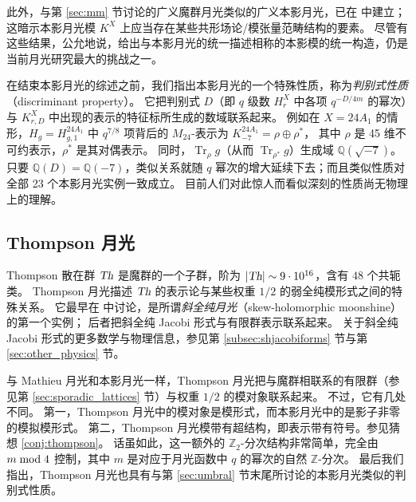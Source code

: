 \documentclass[11pt,a4paper,fontset=windows]{ctexart}
\numberwithin{equation}{section}
\newcommand{\Th}{\operatorname{\textsl{Th}}}      %
\newcommand{\QQ}{\mathbb{Q}}
\newcommand{\ZZ}{\mathbb{Z}}
\newcommand{\xmod}{{\rm \;mod\;}}
\newcommand{\tr}{\operatorname{Tr}}
\begin{document}
此外，与第 \ref{sec:mm} 节讨论的广义魔群月光类似的广义本影月光，已在 \cite{GUM} 中建立；
这暗示本影月光模 $K^X$ 上应当存在某些共形场论/模张量范畴结构的要素。
尽管有这些结果，公允地说，给出与本影月光的统一描述相称的本影模的统一构造，仍是当前月光研究最大的挑战之一。

在结束本影月光的综述之前，我们指出本影月光的一个特殊性质，称为\emph{判别式性质}（discriminant property）。
它把判别式 $D$（即 $q$ 级数 $H^X_r$ 中各项 $q^{-D/4m}$ 的幂次）与 $K_{r,D}^X$ 中出现的表示的特征标所生成的数域联系起来。
例如在 $X=24A_1$ 的情形，$H_g= H^{24A_1}_{g,1}$ 中 $q^{7/8}$ 项背后的 $M_{24}$-表示为 $K^{24A_1}_{-7} = \rho \oplus \rho^\ast$，
其中 $\rho$ 是 45 维不可约表示，$\rho^\ast$ 是其对偶表示。
同时，$\tr_\rho g$（从而 $\tr_{\rho^\ast} g$）生成域 $\QQ(\sqrt{-7})$。
只要 $\QQ(D)=\QQ(-7)$，类似关系就随 $q$ 幂次的增大延续下去；而且类似性质对全部 23 个本影月光实例一致成立。
目前人们对此惊人而看似深刻的性质尚无物理上的理解。


\subsection{Thompson 月光}

Thompson 散在群 $\Th$ 是魔群的一个子群，阶为 $|{\rm \it \Th}|\sim9\cdot10^{16}$，含有 $48$ 个共轭类。
Thompson 月光描述 $\Th$ 的表示论与某些权重 $1/2$ 的弱全纯模形式之间的特殊关系。
它最早在 \cite{Harvey:2015mca} 中讨论，是所谓\emph{斜全纯月光}（skew-holomorphic moonshine）\cite{skew_hol_moonshine} 的第一个实例；
后者把斜全纯 Jacobi 形式与有限群表示联系起来。
关于斜全纯 Jacobi 形式的更多数学与物理信息，参见第 \ref{subsec:shjacobiforms} 节与第 \ref{sec:other_physics} 节。

与 Mathieu 月光和本影月光一样，Thompson 月光把与魔群相联系的有限群（参见第 \ref{sec:sporadic_lattices} 节）与权重 $1/2$ 的模对象联系起来。
不过，它有几处不同。
第一，Thompson 月光中的模对象是模形式，而本影月光中的是影子非零的模拟模形式。
第二，Thompson 月光模带有超结构，即表示带有符号。参见猜想 \ref{conj:thompson}。
话虽如此，这一额外的 $\ZZ_2$-分次结构非常简单，完全由 $m \xmod 4$ 控制，其中 $m$ 是对应于月光函数中 $q$ 的幂次的自然 $\ZZ$-分次。
最后我们指出，Thompson 月光也具有与第 \ref{sec:umbral} 节末尾所讨论的本影月光类似的判别式性质。
\end{document}
